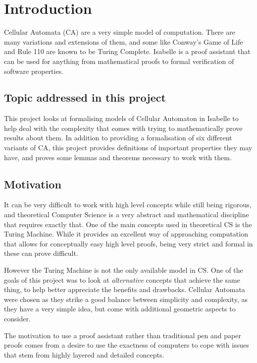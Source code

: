 \chapter{Introduction}
Cellular Automata (CA) are a very simple model of computation.
There are many variations and extensions of them,
and some like Conway's Game of Life and Rule 110 are known to be Turing Complete.
Isabelle is a proof assistant that can be used for anything from mathematical proofs to formal verification of software properties.


\section{Topic addressed in this project}

This project looks at formalising models of Cellular Automaton in Isabelle to help deal with the complexity that comes with trying to mathematically prove results about them.
In addition to providing a formalisation of six different variants of CA,
this project provides definitions of important properties they may have, and proves some lemmas and theorems necessary to work with them.


\section{Motivation}

It can be very difficult to work with high level concepts while still being rigorous,
and theoretical Computer Science is a very abstract and mathematical discipline that requires exactly that.
One of the main concepts used in theoretical CS is the Turing Machine.
While it provides an excellent way of approaching computation that allows for conceptually easy high level proofs,
being very strict and formal in these can prove difficult.

However the Turing Machine is not the only available model in CS.
One of the goals of this project was to look at \emph{alternative} concepts that achieve the same thing,
to help better appreciate the benefits and drawbacks.
Cellular Automata were chosen as they strike a good balance between simplicity and complexity,
as they have a very simple idea, 
but come with additional geometric aspects to consider.

The motivation to use a proof assistant rather than traditional pen and paper proofs
comes from a desire to use the exactness of computers to cope with issues that stem from highly layered and detailed concepts.


